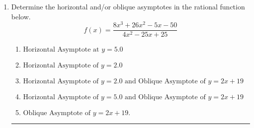 \documentclass[14pt]{extbook}
\newcommand{\litem}[1]{\item#1\hspace*{-1cm}\rule{\textwidth}{0.4pt}}
\begin{document}
\begin{enumerate}
{\begin{enumerate}[label=\Alph*.]
\end{enumerate} }
\litem{
Determine the horizontal and/or oblique asymptotes in the rational function below.\[ f(x) = \frac{8x^{3} +26 x^{2} -5 x -50}{4x^{2} -25 x + 25} \]\begin{enumerate}[label=\Alph*.]
\item \( \text{Horizontal Asymptote at } y = 5.0 \)
\item \( \text{Horizontal Asymptote of } y = 2.0  \)
\item \( \text{Horizontal Asymptote of } y = 2.0 \text{ and Oblique Asymptote of } y = 2x + 19 \)
\item \( \text{Horizontal Asymptote of } y = 5.0 \text{ and Oblique Asymptote of } y = 2x + 19 \)
\item \( \text{Oblique Asymptote of } y = 2x + 19. \)

\end{enumerate} }
\end{enumerate}
\end{document}
